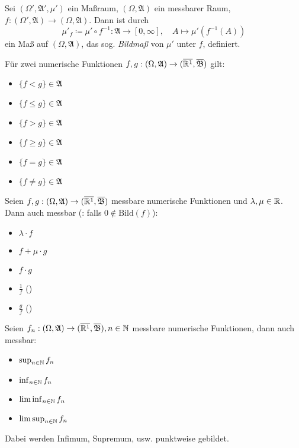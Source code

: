 \documentclass{cheat-sheet}
\newcommand{\Alg}{\mathfrak{A}} %
\newcommand{\Bor}{\mathfrak{B}} %
\renewcommand{\ER}{\overline{\R^1}} %
\begin{document}
\begin{defn}
  Sei $(\Omega', \Alg', \mu')$ ein Maßraum, $(\Omega, \Alg)$ ein messbarer Raum, $f : (\Omega', \Alg) \to (\Omega, \Alg)$. Dann ist durch
  \[ \mu'_f \coloneqq \mu' \circ f^{-1} : \Alg \to [0, \infty], \quad A \mapsto \mu'(f^{-1}(A)) \]
  ein Maß auf $(\Omega, \Alg)$, das sog. \emph{Bildmaß} von $\mu'$ unter $f$, definiert.
\end{defn}

\begin{satz}
  Für zwei numerische Funktionen $f, g : (\Omega, \Alg) \to (\ER, \overline{\Bor})$ gilt:
  \begin{multicols}{3}
    \begin{itemize}
      \item $\{ f < g \} \in \Alg$
      \item $\{ f \leq g \} \in \Alg$
      \item $\{ f > g \} \in \Alg$
      \item $\{ f \geq g \} \in \Alg$
      \item $\{ f = g \} \in \Alg$
      \item $\{ f \not= g \} \in \Alg$
    \end{itemize}
  \end{multicols}
\end{satz}

\begin{satz}
  Seien $f, g : (\Omega, \Alg) \to (\ER, \overline{\Bor})$ messbare numerische Funktionen und $\lambda, \mu \in \mathbb{R}$. Dann auch messbar (\ddag: falls $0 \not\in \mathrm{Bild}(f)$):
  \begin{multicols}{5}
    \begin{itemize}
      \item $\lambda \cdot f$
      \item $f + \mu \cdot g$
      \item $f \cdot g$
      \item $\tfrac{1}{f}$ (\ddag)
      \item $\tfrac{g}{f}$ (\ddag)
    \end{itemize}
  \end{multicols}
\end{satz}

\begin{satz}
  Seien $f_n : (\Omega, \Alg) \to (\ER, \overline{\Bor}), n \in \N$ messbare numerische Funktionen, dann auch messbar:
  \begin{multicols}{4}
    \begin{itemize}
      \item $\sup_{n \in \mathbb{N}} f_n$
      \item $\inf_{n \in \mathbb{N}} f_n$
      \item $\liminf_{n \in \mathbb{N}} f_n$
      \item $\limsup_{n \in \mathbb{N}} f_n$
    \end{itemize}
  \end{multicols}
  \vspace{4pt}
  Dabei werden Infimum, Supremum, usw. punktweise gebildet.
\end{satz}
\end{document}
